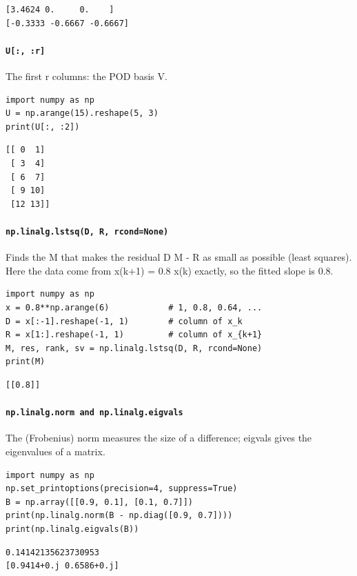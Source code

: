 \begin{lstlisting}[style=out]
[3.4624 0.     0.    ]
[-0.3333 -0.6667 -0.6667]
\end{lstlisting}

\paragraph{\texttt{U[:, :r]}} The first r columns: the POD basis V.

\begin{lstlisting}[style=py]
import numpy as np
U = np.arange(15).reshape(5, 3)
print(U[:, :2])
\end{lstlisting}

\begin{lstlisting}[style=out]
[[ 0  1]
 [ 3  4]
 [ 6  7]
 [ 9 10]
 [12 13]]
\end{lstlisting}

\paragraph{\texttt{np.linalg.lstsq(D, R, rcond=None)}} Finds the M that makes the residual D M - R as small as possible (least squares). Here the data come from x(k+1) = 0.8 x(k) exactly, so the fitted slope is 0.8.

\begin{lstlisting}[style=py]
import numpy as np
x = 0.8**np.arange(6)            # 1, 0.8, 0.64, ...
D = x[:-1].reshape(-1, 1)        # column of x_k
R = x[1:].reshape(-1, 1)         # column of x_{k+1}
M, res, rank, sv = np.linalg.lstsq(D, R, rcond=None)
print(M)
\end{lstlisting}

\begin{lstlisting}[style=out]
[[0.8]]
\end{lstlisting}

\paragraph{\texttt{np.linalg.norm and np.linalg.eigvals}} The (Frobenius) norm measures the size of a difference; eigvals gives the eigenvalues of a matrix.

\begin{lstlisting}[style=py]
import numpy as np
np.set_printoptions(precision=4, suppress=True)
B = np.array([[0.9, 0.1], [0.1, 0.7]])
print(np.linalg.norm(B - np.diag([0.9, 0.7])))
print(np.linalg.eigvals(B))
\end{lstlisting}

\begin{lstlisting}[style=out]
0.14142135623730953
[0.9414+0.j 0.6586+0.j]
\end{lstlisting}
